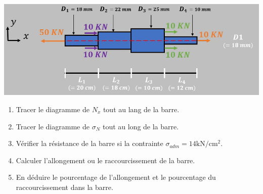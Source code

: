 \documentclass[lecture.tex]{subfiles}
\begin{document}
\exercice{}


\begin{center}
  \includegraphics[scale=0.5]{figA0038.png}
\end{center}

\begin{enumerate}
  \item Tracer le diagramme de $N_{x}$ tout au lang de la barre.
  \item Tracer le diagramme de $\sigma_{N}$ tout au long de la barre.
  \item Vérifier la résistance de la barre si la contrainte $\sigma_{a d m}=14 \mathrm{kN} / \mathrm{cm}^{2}$.
  \item Calculer l'allongement ou le raccourcissement de la barre.
  \item En déduire le pourcentage de l'allongement et le pourcentage du raccourcissement dans la barre.

\end{enumerate}

\finexercice
\end{document}
